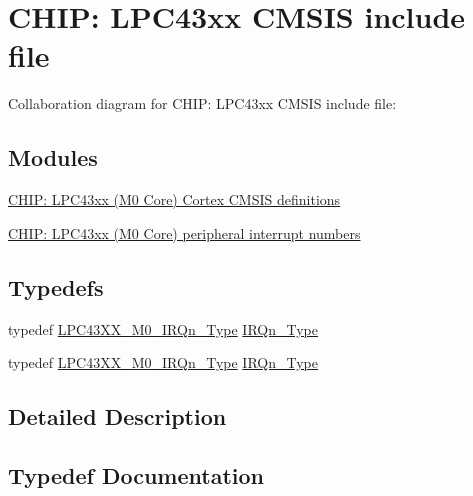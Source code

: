 \hypertarget{group___c_m_s_i_s__43_x_x___m0}{}\section{C\+H\+IP\+: L\+P\+C43xx C\+M\+S\+IS include file}
\label{group___c_m_s_i_s__43_x_x___m0}
Collaboration diagram for C\+H\+IP\+: L\+P\+C43xx C\+M\+S\+IS include file\+:
\subsection*{Modules}
\begin{DoxyCompactItemize}
\item 
\hyperlink{group___c_m_s_i_s__43_x_x___m0___c_o_m_m_o_n}{C\+H\+I\+P\+: L\+P\+C43xx (\+M0 Core) Cortex C\+M\+S\+I\+S definitions}
\item 
\hyperlink{group___c_m_s_i_s__43_x_x___m0___i_r_q}{C\+H\+I\+P\+: L\+P\+C43xx (\+M0 Core) peripheral interrupt numbers}
\end{DoxyCompactItemize}
\subsection*{Typedefs}
\begin{DoxyCompactItemize}
\item 
typedef \hyperlink{group___c_m_s_i_s__43_x_x___m0___i_r_q_ga402456eb2f4f5b3dc2a53f725eed9485}{L\+P\+C43\+X\+X\+\_\+\+M0\+\_\+\+I\+R\+Qn\+\_\+\+Type} \hyperlink{group___c_m_s_i_s__43_x_x___m0_gaf9da996d1de1fbce33c325fc3c4292da}{I\+R\+Qn\+\_\+\+Type}
\item 
typedef \hyperlink{group___c_m_s_i_s__43_x_x___m0___i_r_q_ga402456eb2f4f5b3dc2a53f725eed9485}{L\+P\+C43\+X\+X\+\_\+\+M0\+\_\+\+I\+R\+Qn\+\_\+\+Type} \hyperlink{group___c_m_s_i_s__43_x_x___m0_gaf9da996d1de1fbce33c325fc3c4292da}{I\+R\+Qn\+\_\+\+Type}
\end{DoxyCompactItemize}


\subsection{Detailed Description}


\subsection{Typedef Documentation}
\mbox{\label{group___c_m_s_i_s__43_x_x___m0_gaf9da996d1de1fbce33c325fc3c4292da}} 
